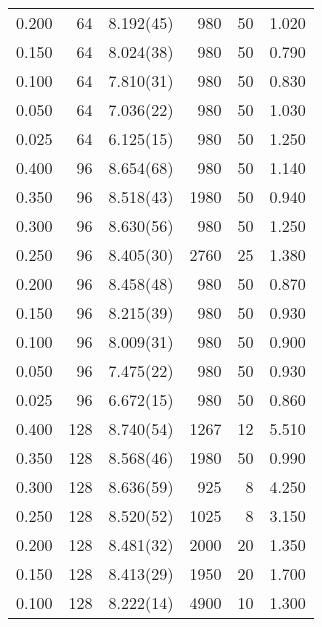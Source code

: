 \begin{tabular}{rrlrrr}
 0.200 &      64 & 8.192(45) &                 980 &                  50 &    1.020 \\
 0.150 &      64 & 8.024(38) &                 980 &                  50 &    0.790 \\
 0.100 &      64 & 7.810(31) &                 980 &                  50 &    0.830 \\
 0.050 &      64 & 7.036(22) &                 980 &                  50 &    1.030 \\
 0.025 &      64 & 6.125(15) &                 980 &                  50 &    1.250 \\
 0.400 &      96 & 8.654(68) &                 980 &                  50 &    1.140 \\
 0.350 &      96 & 8.518(43) &                1980 &                  50 &    0.940 \\
 0.300 &      96 & 8.630(56) &                 980 &                  50 &    1.250 \\
 0.250 &      96 & 8.405(30) &                2760 &                  25 &    1.380 \\
 0.200 &      96 & 8.458(48) &                 980 &                  50 &    0.870 \\
 0.150 &      96 & 8.215(39) &                 980 &                  50 &    0.930 \\
 0.100 &      96 & 8.009(31) &                 980 &                  50 &    0.900 \\
 0.050 &      96 & 7.475(22) &                 980 &                  50 &    0.930 \\
 0.025 &      96 & 6.672(15) &                 980 &                  50 &    0.860 \\
 0.400 &     128 & 8.740(54) &                1267 &                  12 &    5.510 \\
 0.350 &     128 & 8.568(46) &                1980 &                  50 &    0.990 \\
 0.300 &     128 & 8.636(59) &                 925 &                   8 &    4.250 \\
 0.250 &     128 & 8.520(52) &                1025 &                   8 &    3.150 \\
 0.200 &     128 & 8.481(32) &                2000 &                  20 &    1.350 \\
 0.150 &     128 & 8.413(29) &                1950 &                  20 &    1.700 \\
 0.100 &     128 & 8.222(14) &                4900 &                  10 &    1.300 \\

\end{tabular}

